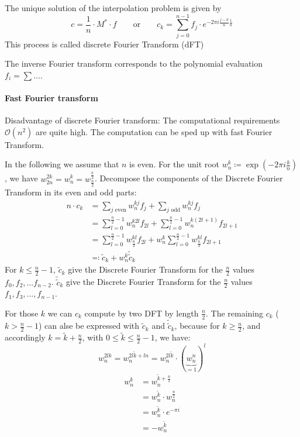 \documentclass[a4paper]{article}
\numberwithin{lecref}{section}
\theoremstyle{break}
\begin{document}
The unique solution of the interpolation problem is given by
\[ c = \frac1n \cdot M^* \cdot f \qquad \text{or} \qquad c_k = \sum_{j=0}^{n-1} f_j \cdot e^{-2 \pi i \frac{j-k}{n} \frac 1n} \]
This process is called discrete Fourier Transform (dFT)

The inverse Fourier transform corresponds to the polynomial evaluation $f_i = \sum \dots$.

\paragraph{Fast Fourier transform}

Disadvantage of discrete Fourier transform: The computational requirements $\mathcal O(n^2)$ are quite high. The computation can be sped up with fast Fourier Transform.

In the following we assume that $n$ is even.
For the unit root $w_n^k \coloneqq \exp(-2 \pi i \frac kn)$, we have $w_{2n}^{2k} = w_n^k = w_{\frac n2}^{\frac k2}$. Decompose the components of the Discrete Fourier Transform in its even and odd parts:
\begin{align*}
  n \cdot c_k
    &= \sum_{j \text{ even}} w_n^{kj} f_j + \sum_{j \text{ odd}} w_n^{kj} f_j \\
    &= \sum_{l=0}^{\frac n2 - 1} w_n^{k2l} f_{2l} + \sum_{l=0}^{\frac n2 - 1} w_n^{k(2t + 1)} f_{2l + 1} \\
    &= \sum_{l=0}^{\frac n2 - 1} w_{\frac n2}^{kl} f_{2l} + w_n^k \sum_{l=0}^{\frac n2 - 1} w_{\frac n2}^{kl} f_{2l+1} \\
    &\eqqcolon \tilde c_k + w_n^k \tilde{\tilde c}_k
\end{align*}
For $k \leq \frac n2 - 1$, $\tilde c_k$ give the Discrete Fourier Transform for the $\frac n2$ values $f_0, f_2, \dots f_{n-2}$. $\tilde{\tilde{c}}_k$ give the Discrete Fourier Transform for the $\frac n2$ values $f_1, f_3, \dots, f_{n-1}$.

For those $k$ we can $c_k$ compute by two DFT by length $\frac n2$. The remaining $c_k$ ($k > \frac n2 - 1$) can alse be expressed with $\tilde c_k$ and $\tilde{\tilde{c}}_k$, because for $k \geq \frac n2$, and accordingly $k = \tilde k + \frac n2$, with $0 \leq \tilde k \leq \frac n2 - 1$, we have:
\[ w_{n}^{2lk} = w_{n}^{2l\tilde k + ln} = w_n^{2l\tilde k} \cdot (\underbrace{w_n^n}_{= 1})^l \]
\begin{align*}
  w_n^k &= w_n^{\tilde k + \frac n2} \\
    &= w_n^{\tilde k} \cdot w_n^{\frac n2} \\
    &= w_n^{\tilde k} \cdot e^{-\pi i} \\
    &= -w_n^{\tilde k}
\end{align*}
\end{document}
